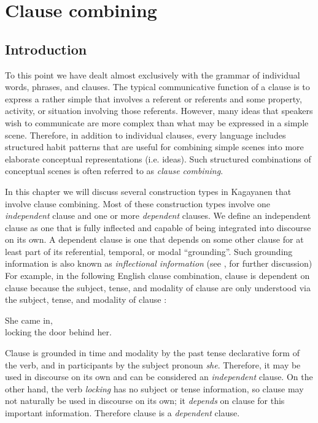 \chapter{Clause combining}
\label{chap:clausecombining}
\section{Introduction}
\label{introduction-12}

To this point we have dealt almost exclusively with the grammar of individual words, phrases, and clauses. The typical communicative function of a clause is to express a rather simple  that involves a referent or referents and some property, activity, or situation involving those referents. However, many ideas that speakers wish to communicate are more complex than what may be expressed in a simple scene. Therefore, in addition to individual clauses, every language includes structured habit patterns that are useful for combining simple scenes into more elaborate conceptual representations (i.e. ideas). Such structured combinations of conceptual scenes is often referred to as \textit{clause combining}.

In this chapter we will discuss several construction types in Kagayanen that involve clause combining. Most of these construction types involve one \textit{independent} clause and one or more \textit{dependent} clauses. We define an independent clause as one that is fully inflected and capable of being integrated into discourse on its own. A dependent clause is one that depends on some other clause for at least part of its referential, temporal, or modal “grounding”. Such grounding information is also known as \textit{inflectional information} (see ,  for further discussion) For example, in the following English clause combination, clause  is dependent on clause  because the subject, tense, and modality of clause  are only understood via the subject, tense, and modality of clause :

\ea
    \ea
    \label{bkm:Ref460395811}
    She came in, \\
    \ex
    \label{bkm:Ref460480260}
    locking the door behind her.
    \z
\z


Clause  is grounded in time and modality by the past tense declarative form of the verb, and in participants by the subject pronoun \textit{she}. Therefore, it may be used in discourse on its own and can be considered an \textit{independent} clause. On the other hand,  the verb \textit{locking} has no subject or tense information, so clause  may not naturally be used in discourse on its own; it \textit{depends} on clause  for this important information. Therefore clause  is a \textit{dependent} clause.

